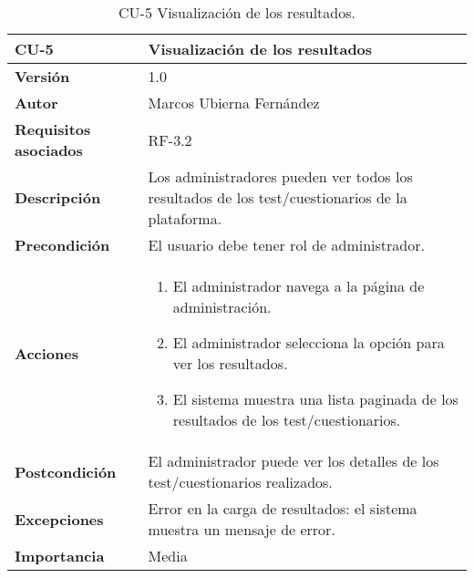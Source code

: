 \begin{table}[p]
	\centering
	\begin{tabularx}{\linewidth}{ p{} p{} }
		\toprule
		\textbf{CU-5}    & \textbf{Visualización de los resultados}\\
		\toprule
		\textbf{Versión}              & 1.0    \\
		\textbf{Autor}                & Marcos Ubierna Fernández \\
		\textbf{Requisitos asociados} & RF-3.2 \\
		\textbf{Descripción}          & Los administradores pueden ver todos los resultados de los test/cuestionarios de la plataforma. \\
		\textbf{Precondición}         & El usuario debe tener rol de administrador. \\
		\textbf{Acciones}             &
		\begin{enumerate}
			\def\labelenumi{\arabic{enumi}.}
			\tightlist
			\item El administrador navega a la página de administración.
			\item El administrador selecciona la opción para ver los resultados.
                \item El sistema muestra una lista paginada de los resultados de los test/cuestionarios.
		\end{enumerate}\\
		\textbf{Postcondición}        & El administrador puede ver los detalles de los test/cuestionarios realizados. \\
		\textbf{Excepciones}          & Error en la carga de resultados: el sistema muestra un mensaje de error. \\
		\textbf{Importancia}          & Media \\
		\bottomrule
	\end{tabularx}
	\caption{CU-5 Visualización de los resultados.}
\end{table}

